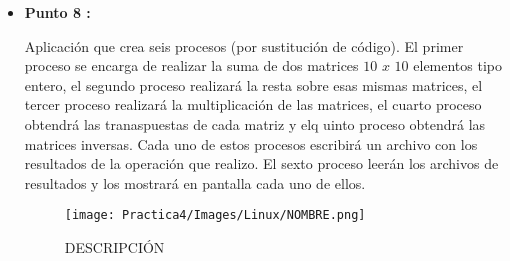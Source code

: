 \documentclass[12pt]{article}
\begin{document}
\begin{itemize}
                                

                \item[\Checkmark] \textbf{Punto 8 :}
                    
                    Aplicación que crea seis procesos (por sustitución de código). El primer proceso se encarga de realizar la suma de dos matrices $10$ $x$ $10$ elementos tipo entero, el segundo proceso realizará la resta sobre esas mismas matrices, el tercer proceso realizará la multiplicación de las matrices, el cuarto proceso obtendrá las tranaspuestas de cada matriz y elq uinto proceso obtendrá las matrices inversas. Cada uno de estos procesos escribirá un archivo con los resultados de la operación que realizo. El sexto proceso leerán los archivos de resultados y los mostrará en pantalla cada uno de ellos.

                    \begin{figure}[h!]
                        \centering
                        \texttt{[image: Practica4/Images/Linux/NOMBRE.png]}
                        \caption{DESCRIPCIÓN}
                    \end{figure}

            \end{itemize}
        
			 
	\newpage    
	        
\end{document}
